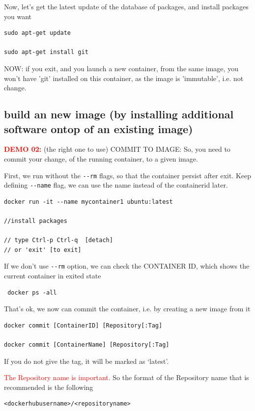 Now, let's get the latest update of the database of packages, and install packages you want
\begin{verbatim}
sudo apt-get update

sudo apt-get install git

\end{verbatim}

NOW: if you exit, and you launch a new container, from the same image, you won't
have 'git' installed on this container, as the image is 'immutable', i.e. not
change.

\subsection{build an new image (by installing additional software ontop of an existing image)}
\label{sec:Docker-build-image}


\textcolor{red}{\bf DEMO 02:} (the right one to use)  COMMIT TO IMAGE: So, you
need to commit your change, of the running container, to a given image.

First, we run without the \verb!--rm! flags, so that the container persist after exit.
Keep defining \verb!--name! flag, we can use the name instead of the containerid later.

\begin{verbatim}
docker run -it --name mycontainer1 ubuntu:latest

//install packages

// type Ctrl-p Ctrl-q  [detach]
// or 'exit' [to exit]
\end{verbatim}

If we don't use \verb!--rm! option, we can check the CONTAINER ID, which shows
the current container in exited state
\begin{verbatim}
 docker ps -all
\end{verbatim}


That's ok, we now can commit the container, i.e. by creating a new image from it
\begin{verbatim}
docker commit [ContainerID] [Repository[:Tag]

docker commit [ContainerName] [Repository[:Tag]
\end{verbatim}
If you do not give the tag, it will be marked as ‘latest’.

\textcolor{red}{The Repository name is important.} So the format of the
Repository name that is recommended is the following
\begin{verbatim}
<dockerhubusername>/<repositoryname>
\end{verbatim}

